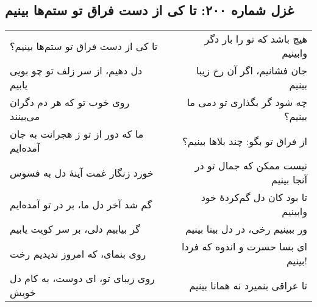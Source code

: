 \begin{center}
\section*{غزل شماره ۲۰۰: تا کی از دست فراق تو ستم‌ها بینیم}
\label{sec:200}
\begin{longtable}{l p{0.5cm} r}
تا کی از دست فراق تو ستم‌ها بینیم؟
&&
هیچ باشد که تو را بار دگر وابینیم
\\
دل دهیم، از سر زلف تو چو بویی یابیم
&&
جان فشانیم، اگر آن رخ زیبا بینیم
\\
روی خوب تو که هر دم دگران می‌بینند
&&
چه شود گر بگذاری تو دمی ما بینیم؟
\\
ما که دور از تو ز هجرانت به جان آمده‌ایم
&&
از فراق تو بگو: چند بلاها بینیم؟
\\
خورد زنگار غمت آینهٔ دل به فسوس
&&
نیست ممکن که جمال تو در آنجا بینیم
\\
گم شد آخر دل ما، بر در تو آمده‌ایم
&&
تا بود کان دل گم‌کردهٔ خود وابینیم
\\
گر بیابیم دلی، بر سر کویت یابیم
&&
ور ببینیم رخی، در دل بینا بینیم
\\
روی بنمای، که امروز ندیدیم رخت
&&
ای بسا حسرت و اندوه که فردا بینیم!
\\
روی زیبای تو، ای دوست، به کام دل خویش
&&
تا عراقی بنمیرد نه همانا بینیم
\\
\end{longtable}
\end{center}
